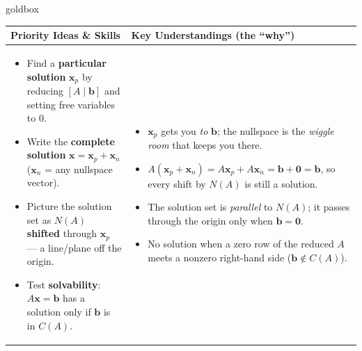 \documentclass[10pt]{article}
\newcommand{\xx}{\mathbf{x}}
\newcommand{\bb}{\mathbf{b}}
\newcommand{\zero}{\mathbf{0}}
\begin{document}
\renewcommand{\arraystretch}{1.4}
\begin{skillbox}{goldbox}
\begin{tabularx}{\linewidth}{@{}X|X@{}}
\textbf{Priority Ideas \& Skills} & \textbf{Key Understandings (the ``why'')} \\[2pt]
\hline
\vspace{-6pt}
\begin{itemize}[leftmargin=1.1em, nosep, after=\vspace{2pt}]
  \item Find a \textbf{particular solution} $\xx_p$ by reducing $[A\mid\bb]$ and setting free variables to $0$.
  \item Write the \textbf{complete solution} $\xx=\xx_p+\xx_n$ ($\xx_n$ = any nullspace vector).
  \item Picture the solution set as $N(A)$ \textbf{shifted} through $\xx_p$ --- a line/plane off the origin.
  \item Test \textbf{solvability}: $A\xx=\bb$ has a solution only if $\bb$ is in $C(A)$.
\end{itemize}
&
\vspace{-6pt}
\begin{itemize}[leftmargin=1.1em, nosep, after=\vspace{2pt}]
  \item $\xx_p$ gets you \emph{to} $\bb$; the nullspace is the \emph{wiggle room} that keeps you there.
  \item $A(\xx_p+\xx_n)=A\xx_p+A\xx_n=\bb+\zero=\bb$, so every shift by $N(A)$ is still a solution.
  \item The solution set is \emph{parallel} to $N(A)$; it passes through the origin only when $\bb=\zero$.
  \item No solution when a zero row of the reduced $A$ meets a nonzero right-hand side ($\bb\notin C(A)$).
\end{itemize}
\end{tabularx}
\end{skillbox}
\end{document}
